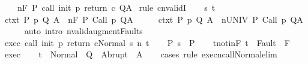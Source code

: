 \begin{isabellebody}
\ \ \ {\isachardoublequoteopen}{\isasymGamma}{\isacharcomma}{\isasymTheta}\ {\isasymTurnstile}n{\isacharcolon}\isactrlbsub {\isacharslash}F\isactrlesub \ P\ {\isacharparenleft}call\ init\ p\ return\ c{\isacharparenright}\ Q{\isacharcomma}A{\isachardoublequoteclose}\isanewline
%
\isadelimproof
%
\endisadelimproof
%
\isatagproof
{}\isamarkupfalse%
\ {\isacharparenleft}rule\ cnvalidI{\isacharparenright}\isanewline
\ \ \isamarkupfalse%
\ s\ t\isanewline
\ \ \isamarkupfalse%
\ ctxt{\isacharcolon}\ {\isachardoublequoteopen}{\isasymforall}{\isacharparenleft}P{\isacharcomma}\ p{\isacharcomma}\ Q{\isacharcomma}\ A{\isacharparenright}{\isasymin}{\isasymTheta}{\isachardot}\ {\isasymGamma}\ {\isasymTurnstile}n{\isacharcolon}\isactrlbsub {\isacharslash}F\isactrlesub \ P\ {\isacharparenleft}Call\ p{\isacharparenright}\ Q{\isacharcomma}A{\isachardoublequoteclose}\isanewline
\ \ \isamarkupfalse%
\ \isamarkupfalse%
\ ctxt{\isacharprime}{\isacharcolon}\ {\isachardoublequoteopen}{\isasymforall}{\isacharparenleft}P{\isacharcomma}\ p{\isacharcomma}\ Q{\isacharcomma}\ A{\isacharparenright}{\isasymin}{\isasymTheta}{\isachardot}\ {\isasymGamma}\ {\isasymTurnstile}n{\isacharcolon}\isactrlbsub {\isacharslash}UNIV\isactrlesub \ P\ {\isacharparenleft}Call\ p{\isacharparenright}\ Q{\isacharcomma}A{\isachardoublequoteclose}\isanewline
\ \ \ \ \isamarkupfalse%
\ {\isacharparenleft}auto\ intro{\isacharcolon}\ nvalid{\isacharunderscore}augment{\isacharunderscore}Faults{\isacharparenright}\isanewline
\ \ \isamarkupfalse%
\ exec{\isacharcolon}\ {\isachardoublequoteopen}{\isasymGamma}{\isasymturnstile}{\isasymlangle}call\ init\ p\ return\ c{\isacharcomma}Normal\ s{\isasymrangle}\ {\isacharequal}n{\isasymRightarrow}\ t{\isachardoublequoteclose}\isanewline
\ \ \isamarkupfalse%
\ P{\isacharcolon}\ {\isachardoublequoteopen}s\ {\isasymin}\ P{\isachardoublequoteclose}\isanewline
\ \ \isamarkupfalse%
\ t{\isacharunderscore}notin{\isacharunderscore}F{\isacharcolon}\ {\isachardoublequoteopen}t\ {\isasymnotin}\ Fault\ {\isacharbackquote}\ F{\isachardoublequoteclose}\isanewline
\ \ \isamarkupfalse%
\ exec\isanewline
\ \ \isamarkupfalse%
\ {\isachardoublequoteopen}t\ {\isasymin}\ Normal\ {\isacharbackquote}\ Q\ {\isasymunion}\ Abrupt\ {\isacharbackquote}\ A{\isachardoublequoteclose}\isanewline
\ \ \isamarkupfalse%
\ {\isacharparenleft}cases\ rule{\isacharcolon}\ execn{\isacharunderscore}call{\isacharunderscore}Normal{\isacharunderscore}elim{\isacharparenright}\isanewline

\end{isabellebody}
